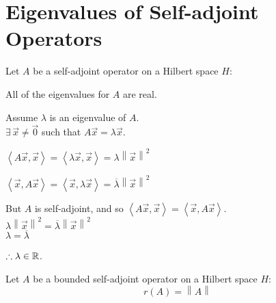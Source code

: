 \documentclass[letterpaper,12pt,fleqn]{article}
\renewcommand{\l}{\lambda}
\newcommand{\vx}{\vec{x}}
\newcommand{\vo}{\vec{0}}
\newcommand{\norm}[1]{\left\|#1\right\|}
\newcommand{\inner}[1]{\left<#1\right>}
\newcommand{\conj}[1]{\overline{#1}}
\begin{document}
\section*{Eigenvalues of Self-adjoint Operators}

\begin{theorem}
  Let $A$ be a self-adjoint operator on a Hilbert space $H$:

  \qquad All of the eigenvalues for $A$ are real.
\end{theorem}

\begin{theproof}
  Assume $\l$ is an eigenvalue of $A$. \\
  $\exists\,\vx\ne\vo$ such that $A\vx=\l\vx$.

  $\inner{A\vx,\vx}=\inner{\l\vx,\vx}=\l\norm{\vx}^2$

  $\inner{\vx,A\vx}=\inner{\vx,\l\vx}=\conj{\l}\norm{\vx}^2$

  But $A$ is self-adjoint, and so $\inner{A\vx,\vx}=\inner{\vx,A\vx}$. \\
  $\l\norm{\vx}^2=\conj{\l}\norm{\vx}^2$ \\
  $\l=\conj{\l}$

  $\therefore\l\in\R$.
\end{theproof}

\begin{theorem}
  Let $A$ be a bounded self-adjoint operator on a Hilbert space $H$:
  \[r(A)=\norm{A}\]
\end{theorem}
\end{document}
